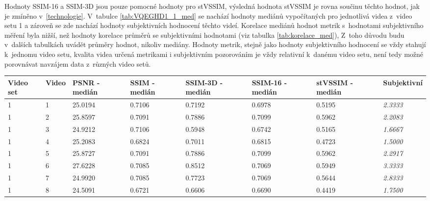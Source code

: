 \documentclass[thesis=M,czech]{FITthesis}[2016/06/26]
\begin{document}
Hodnoty SSIM-16 a SSIM-3D jsou pouze pomocné hodnoty pro stVSSIM, výsledná hodnota stVSSIM je rovna součinu těchto hodnot, jak je zmíněno v~\autoref{technologie}.
V~tabulce \ref{tab:VQEGHD1_1_med} se nachází hodnoty mediánů vypočítaných pro jednotlivá videa z~video setu 1 a zároveň se zde nachází hodnoty subjektivních hodnocení těchto videí. Korelace mediánů hodnot metrik   s~hodnotami subjektivního měření byla nižší, než hodnoty korelace průměrů se subjektivními hodnotami (viz tabulka \ref{tab:korelace_med}), Z~toho důvodu budu v~dalších tabulkách uvádět průměry hodnot, nikoliv mediány. Hodnoty metrik, stejně jako hodnoty subjektivního hodnocení se vždy stahují k~jednomu video setu, kvalita videa určená metrikami i subjektivním pozorováním je vždy relativní k~danému video setu, není tedy možné porovnávat navzájem data z~různých video setů.
\begin{table}[]
\centering
\begin{tabular}{|p{.85cm}|p{.85cm}|p{1.3cm}|p{1.3cm}|p{1.5cm}|p{.5cm}|p{1.5cm}|p{1.8cm}|}
\hline
Video set & Video & PSNR - medián & SSIM - medián & SSIM-3D - medián & SSIM-16 - medián & stVSSIM - medián & Subjektivní \\ \hline
1         & 1     & 25.0194       & 0.7106        & 0.7192           & 0.6978         & 0.5195           &  \textit{2.3333}      \\ \hline
1         & 2     & 25.8597       & 0.7091        & 0.7886           & 0.7099         & 0.5962           &  \textit{2.2083}      \\ \hline
1         & 3     & 24.9212       & 0.7106        & 0.5948           & 0.6742         & 0.5165           &  \textit{1.6667}      \\ \hline
1         & 4     & 25.2083       & 0.6824        & 0.7011           & 0.6815         & 0.4723           &  \textit{1.5000}      \\ \hline
1         & 5     & 25.8727       & 0.7091        & 0.7886           & 0.7099         & 0.5962           &  \textit{2.2917}      \\ \hline
1         & 6     & 27.6228       & 0.7085        & 0.8512           & 0.7069         & 0.5949           &  \textit{3.3333}      \\ \hline
1         & 7     & 24.9920       & 0.7085        & 0.7723           & 0.7069         & 0.5644           &  \textit{2.8333}      \\ \hline
1         & 8     & 24.5091       & 0.6721        & 0.6606           & 0.6690         & 0.4419           &  \textit{1.7500}      \\ \hline

\end{tabular}
\end{table}
\end{document}
